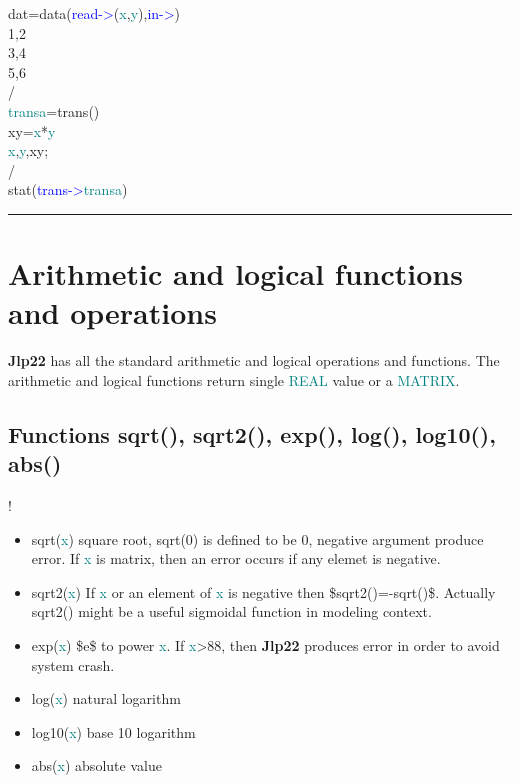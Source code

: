 {\begin{example}[comoptex]
\label{comoptex} 
\noindent dat=\textcolor{VioletRed}{data}(\textcolor{blue}{read->}(\textcolor{teal}{x},\textcolor{teal}{y}),\textcolor{blue}{in->})\\ 
1,2\\ 
3,4\\ 
5,6\\ 
/  \\ 
\textcolor{teal}{transa}=\textcolor{VioletRed}{trans}()\\ 
xy=\textcolor{teal}{x}*\textcolor{teal}{y}\\ 
\textcolor{teal}{x},\textcolor{teal}{y},xy;\\ 
/                                          \\ 
\textcolor{VioletRed}{stat}(\textcolor{blue}{trans->}\textcolor{teal}{transa})\\ 
\end{example} 
\vspace{-7mm} \rule{5cm}{0.1pt} 
\onehalfspacing 
\section{Arithmetic and logical functions and operations} 
\label{arith} 
\textbf{Jlp22} has all the standard arithmetic and logical operations and functions. 
The arithmetic and logical functions return single \textcolor{teal}{REAL} value or a \textcolor{teal}{MATRIX}. 
\subsection{Functions \textcolor{VioletRed}{sqrt}(), \textcolor{VioletRed}{sqrt2}(), \textcolor{VioletRed}{exp}(), \textcolor{VioletRed}{log}(), \textcolor{VioletRed}{log10}(), \textcolor{VioletRed}{abs}()} 
\label{arfu1} 
! 
\begin{itemize} 
\item \textcolor{VioletRed}{sqrt}(\textcolor{teal}{x}) square root, \textcolor{VioletRed}{sqrt}(0) is defined to be 0, negative argument produce error. 
If {\textcolor{teal}{x}} is matrix, then an error occurs if any elemet is negative. 
\item \textcolor{VioletRed}{sqrt2}(\textcolor{teal}{x}) If {\textcolor{teal}{x}} or an element of {\textcolor{teal}{x}} is negative then \$\textcolor{VioletRed}{sqrt2}()=-\textcolor{VioletRed}{sqrt}()\$. Actually \textcolor{VioletRed}{sqrt2}() might be a 
useful sigmoidal function in modeling context. 
\item \textcolor{VioletRed}{exp}(\textcolor{teal}{x}) \$e\$ to power {\textcolor{teal}{x}}. If {\textcolor{teal}{x}}>88, then \textbf{Jlp22} produces error in order to avoid system 
crash. 
\item \textcolor{VioletRed}{log}(\textcolor{teal}{x}) natural logarithm 
\item \textcolor{VioletRed}{log10}(\textcolor{teal}{x}) base 10 logarithm 
\item \textcolor{VioletRed}{abs}(\textcolor{teal}{x}) absolute value 
\end{itemize} 
}
